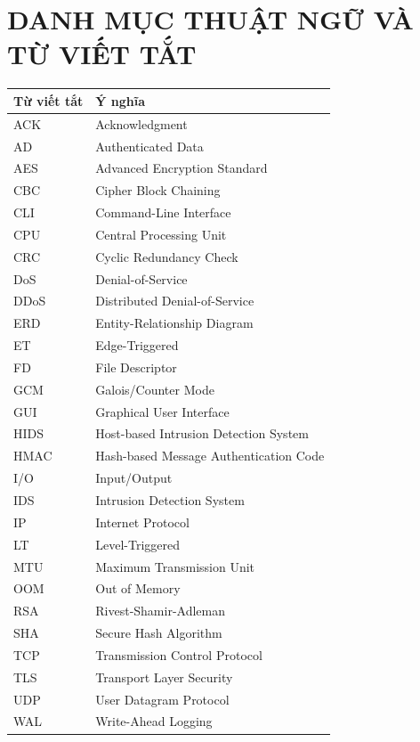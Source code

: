 \chapter*{DANH MỤC THUẬT NGỮ VÀ TỪ VIẾT TẮT}

\begin{longtable}{ll}\toprule

\textbf{Từ viết tắt} & \textbf{Ý nghĩa} \\
\midrule
ACK & Acknowledgment \\
AD & Authenticated Data \\
AES & Advanced Encryption Standard \\
CBC & Cipher Block Chaining \\
CLI & Command-Line Interface \\
CPU & Central Processing Unit \\
CRC & Cyclic Redundancy Check \\
DoS & Denial-of-Service \\
DDoS & Distributed Denial-of-Service \\
ERD & Entity-Relationship Diagram \\
ET & Edge-Triggered \\
FD & File Descriptor \\
GCM & Galois/Counter Mode \\
GUI & Graphical User Interface \\
HIDS & Host-based Intrusion Detection System \\
HMAC & Hash-based Message Authentication Code \\
I/O & Input/Output \\
IDS & Intrusion Detection System \\
IP & Internet Protocol \\
LT & Level-Triggered \\
MTU & Maximum Transmission Unit \\
OOM & Out of Memory \\
RSA & Rivest-Shamir-Adleman \\
SHA & Secure Hash Algorithm \\
TCP & Transmission Control Protocol \\
TLS & Transport Layer Security \\
UDP & User Datagram Protocol \\
WAL & Write-Ahead Logging \\

\bottomrule\end{longtable}
